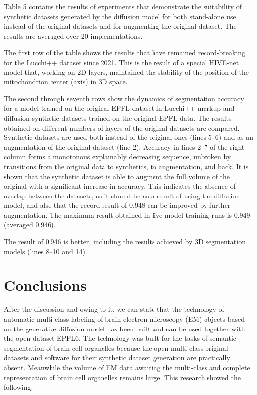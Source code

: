 \documentclass[journal,article,submit,pdftex,moreauthors]{Definitions/mdpi}
\begin{document}
Table 5 contains the results of experiments that demonstrate the suitability of synthetic datasets generated by the diffusion model for both stand-alone use instead of the original datasets and for augmenting the original dataset. The results are averaged over 20 implementations.

The first row of the table shows the results that have remained record-breaking for the Lucchi++ dataset since 2021. This is the result of a special HIVE-net model that, working on 2D layers, maintained the stability of the position of the mitochondrion center (axis) in 3D space.

The second through seventh rows show the dynamics of segmentation accuracy for a model trained on the original EPFL dataset in Lucchi++ markup and diffusion synthetic datasets trained on the original EPFL data. The results obtained on different numbers of layers of the original datasets are compared. Synthetic datasets are used both instead of the original ones (lines 5–6) and as an augmentation of the original dataset (line 2). Accuracy in lines 2–7 of the right column forms a monotonous explainably decreasing sequence, unbroken by transitions from the original data to synthetics, to augmentation, and back. It is shown that the synthetic dataset is able to augment the full volume of the original with a significant increase in accuracy. This indicates the absence of overlap between the datasets, as it should be as a result of using the diffusion model, and also that the record result of 0.948 can be improved by further augmentation. The maximum result obtained in five model training runs is 0.949 (averaged 0.946).

The result of 0.946 is better, including the results achieved by 3D segmentation models (lines 8–10 and 14).

\section{Conclusions}

After the discussion and owing to it, we can state that the technology of automatic multi-class labeling of brain electron microscopy (EM) objects based on the generative diffusion model has been built and can be used together with the open dataset EPFL6. The technology was built for the tasks of semantic segmentation of brain cell organelles because the open multi-class original datasets and software for their synthetic dataset generation are practically absent. Meanwhile the volume of EM data awaiting the multi-class and complete representation of brain cell organelles remains large. This research showed the following:
\end{document}
